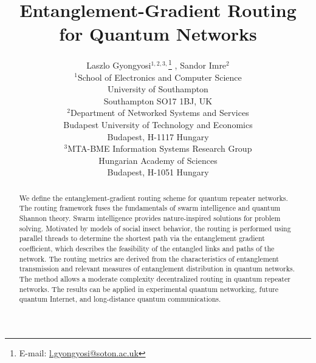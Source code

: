\documentclass[11pt]{article}%
\begin{document}
\title{Entanglement-Gradient Routing for Quantum Networks}
\author{Laszlo Gyongyosi$^{1,2,3,}$\thanks{E-mail: \href{mailto:l.gyongyosi@soton.ac.uk}{l.gyongyosi@soton.ac.uk}} , Sandor Imre$^{2}$\\
$^{1}$School of Electronics and Computer Science\\University of Southampton\\Southampton SO17 1BJ, UK\\
$^{2}$Department of Networked Systems and Services\\Budapest University of Technology and Economics\\Budapest, H-1117 Hungary\\
$^{3}$MTA-BME Information Systems Research Group\\Hungarian Academy of Sciences\\Budapest, H-1051 Hungary}
\date{}

\maketitle
\begin{abstract}
We define the entanglement-gradient routing scheme for quantum repeater networks. The routing framework fuses the fundamentals of swarm intelligence and quantum Shannon theory. Swarm intelligence provides nature-inspired solutions for problem solving. Motivated by models of social insect behavior, the routing is performed using parallel threads to determine the shortest path via the entanglement gradient coefficient, which describes the feasibility of the entangled links and paths of the network. The routing metrics are derived from the characteristics of entanglement transmission and relevant measures of entanglement distribution in quantum networks. The method allows a moderate complexity decentralized routing in quantum repeater networks. The results can be applied in experimental quantum networking, future quantum Internet, and long-distance quantum communications.
\end{abstract}
\end{document}
